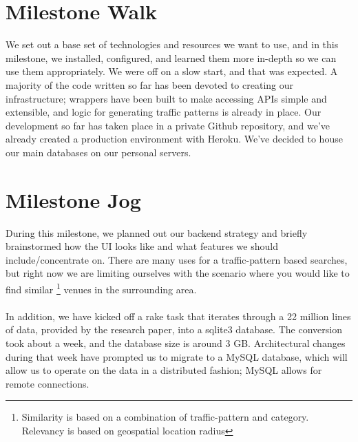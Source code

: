 \documentclass{article}
\begin{document}
%


%
\section{Milestone Walk}
We set out a base set of technologies and resources we want to use, and in this milestone, we installed,
configured, and learned them more in-depth so we can use them appropriately. We were off on a slow start,
and that was expected. A majority of the code written so far has been devoted to creating our infrastructure; wrappers have been built to make accessing APIs simple and extensible, and logic for generating traffic patterns is already in place. Our development so far has taken place in a private Github repository, and we've already created a production environment with Heroku. We've decided to house our main databases on our personal servers.

\section{Milestone Jog}
During this milestone, we planned out our backend strategy and briefly brainstormed how the UI looks like and 
what features we should include/concentrate on. There are many uses for a traffic-pattern based searches, but 
right now we are limiting ourselves with the scenario where you would like to find similar
\footnote{Similarity is based on a combination of traffic-pattern and category. Relevancy is based on  
geospatial location radius} venues in the surrounding area. \\ \\
In addition, we have kicked off a rake task that iterates through a 22 million lines of data, provided
by the research paper, into a sqlite3 database. The conversion took about a week, and the database
size is around 3 GB. Architectural changes during that week have prompted us to migrate to a MySQL database, which will allow us to operate on the data in a distributed fashion; MySQL allows for remote connections.
\end{document}
